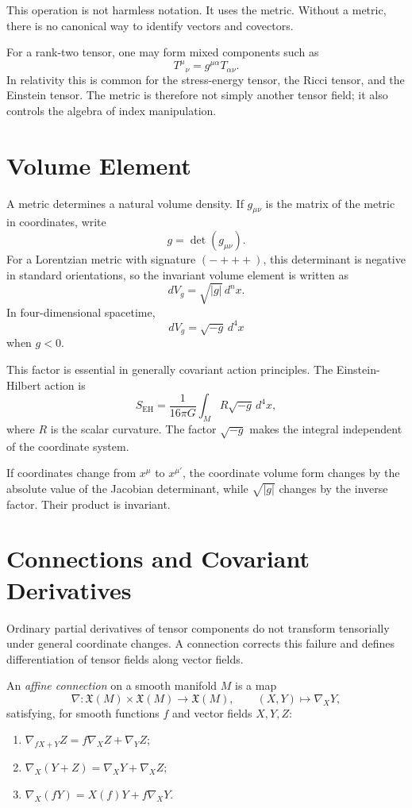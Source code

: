 This operation is not harmless notation. It uses the metric. Without a metric,
there is no canonical way to identify vectors and covectors.

For a rank-two tensor, one may form mixed components such as
\[
T^\mu{}_{\nu}=g^{\mu\alpha}T_{\alpha\nu}.
\]
In relativity this is common for the stress-energy tensor, the Ricci tensor, and
the Einstein tensor. The metric is therefore not simply another tensor field; it
also controls the algebra of index manipulation.

\clearpage

\section{Volume Element}

A metric determines a natural volume density. If \(g_{\mu\nu}\) is the matrix of
the metric in coordinates, write
\[
g=\det(g_{\mu\nu}).
\]
For a Lorentzian metric with signature \((-+++)\), this determinant is negative
in standard orientations, so the invariant volume element is written as
\[
dV_g=\sqrt{|g|}\,d^nx.
\]
In four-dimensional spacetime,
\[
dV_g=\sqrt{-g}\,d^4x
\]
when \(g<0\).

This factor is essential in generally covariant action principles. The
Einstein-Hilbert action is
\[
S_{\mathrm{EH}}=\frac{1}{16\pi G}\int_M R\sqrt{-g}\,d^4x,
\]
where \(R\) is the scalar curvature. The factor \(\sqrt{-g}\) makes the
integral independent of the coordinate system.

If coordinates change from \(x^\mu\) to \(x^{\mu'}\), the coordinate volume form
changes by the absolute value of the Jacobian determinant, while \(\sqrt{|g|}\)
changes by the inverse factor. Their product is invariant.

\clearpage

\section{Connections and Covariant Derivatives}

Ordinary partial derivatives of tensor components do not transform tensorially
under general coordinate changes. A connection corrects this failure and defines
differentiation of tensor fields along vector fields.

\begin{definitionbox}
An \emph{affine connection} on a smooth manifold \(M\) is a map
\[
\nabla:\mathfrak{X}(M)\times\mathfrak{X}(M)\to\mathfrak{X}(M),
\qquad
(X,Y)\mapsto \nabla_XY,
\]
satisfying, for smooth functions \(f\) and vector fields \(X,Y,Z\):
\begin{enumerate}
    \item \(\nabla_{fX+Y}Z=f\nabla_XZ+\nabla_YZ\);
    \item \(\nabla_X(Y+Z)=\nabla_XY+\nabla_XZ\);
    \item \(\nabla_X(fY)=X(f)Y+f\nabla_XY\).
\end{enumerate}
\end{definitionbox}

